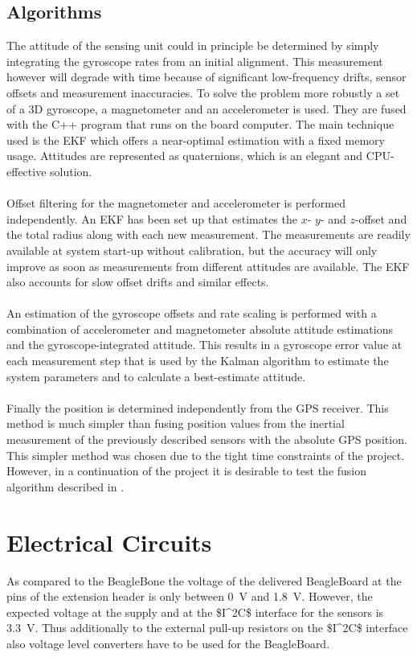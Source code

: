 
\subsection{Algorithms}

The attitude of the sensing unit could in principle be determined by simply integrating the gyroscope rates from an initial alignment. This measurement however will degrade with time because of significant low-frequency drifts, sensor offsets and measurement inaccuracies. To solve the problem more robustly a set of a 3D gyroscope, a magnetometer and an accelerometer is used. They are fused with the C++ program that runs on the board computer. The main technique used is the \ac{EKF} which offers a near-optimal estimation with a fixed memory usage. Attitudes are represented as quaternions, which is an elegant and \ac{CPU}-effective solution.
\\
\\
Offset filtering for the magnetometer and accelerometer is performed independently. An \ac{EKF} has been set up that estimates the $x$- $y$- and $z$-offset and the total radius along with each new measurement. The measurements are readily available at system start-up without calibration, but the accuracy will only improve as soon as measurements from different attitudes are available. The \ac{EKF} also accounts for slow offset drifts and similar effects.
\\
\\
An estimation of the gyroscope offsets and rate scaling is performed with a combination of accelerometer and magnetometer absolute attitude estimations and the gyroscope-integrated attitude. This results in a gyroscope error value at each measurement step that is used by the Kalman algorithm to estimate the system parameters and to calculate a best-estimate attitude.
\\
\\
Finally the position is determined independently from the \ac{GPS} receiver. This method is much simpler than fusing position values from the inertial measurement of the previously described sensors with the absolute \ac{GPS} position. This simpler method was chosen due to the tight time constraints of the project. However, in a continuation of the project it is desirable to test the fusion algorithm described in \cite[chap. 6.4]{book:stochastic}.

\FloatBarrier
\section{Electrical Circuits}

As compared to the BeagleBone the voltage of the delivered BeagleBoard at the pins of the extension header is only between 0~V and 1.8~V. However, the expected voltage at the supply and at the \ac{$I^2C$} interface for the sensors is 3.3~V. Thus additionally to the external pull-up resistors on the \ac{$I^2C$} interface also voltage level converters have to be used for the BeagleBoard.
